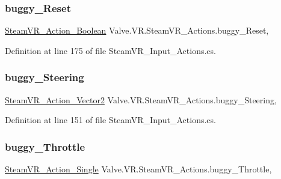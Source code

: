 \subsubsection{\texorpdfstring{buggy\_Reset}{buggy\_Reset}}
{\footnotesize\ttfamily \mbox{\hyperlink{class_valve_1_1_v_r_1_1_steam_v_r___action___boolean}{Steam\+V\+R\+\_\+\+Action\+\_\+\+Boolean}} Valve.\+V\+R.\+Steam\+V\+R\+\_\+\+Actions.\+buggy\+\_\+\+Reset\hspace{0.3cm}{\ttfamily [static]}, {\ttfamily [get]}}



Definition at line 175 of file Steam\+V\+R\+\_\+\+Input\+\_\+\+Actions.\+cs.

\mbox{\label{class_valve_1_1_v_r_1_1_steam_v_r___actions_ac4481ccbf0fe3042be55fe1daa8107c0}} 
\subsubsection{\texorpdfstring{buggy\_Steering}{buggy\_Steering}}
{\footnotesize\ttfamily \mbox{\hyperlink{class_valve_1_1_v_r_1_1_steam_v_r___action___vector2}{Steam\+V\+R\+\_\+\+Action\+\_\+\+Vector2}} Valve.\+V\+R.\+Steam\+V\+R\+\_\+\+Actions.\+buggy\+\_\+\+Steering\hspace{0.3cm}{\ttfamily [static]}, {\ttfamily [get]}}



Definition at line 151 of file Steam\+V\+R\+\_\+\+Input\+\_\+\+Actions.\+cs.

\mbox{\label{class_valve_1_1_v_r_1_1_steam_v_r___actions_aa3c4a28303e0e31d45be2928de60cb1a}} 
\subsubsection{\texorpdfstring{buggy\_Throttle}{buggy\_Throttle}}
{\footnotesize\ttfamily \mbox{\hyperlink{class_valve_1_1_v_r_1_1_steam_v_r___action___single}{Steam\+V\+R\+\_\+\+Action\+\_\+\+Single}} Valve.\+V\+R.\+Steam\+V\+R\+\_\+\+Actions.\+buggy\+\_\+\+Throttle\hspace{0.3cm}{\ttfamily [static]}, {\ttfamily [get]}}




